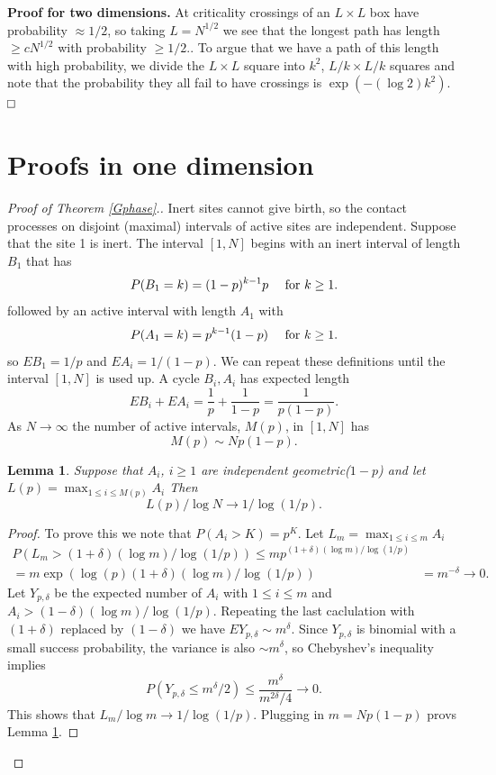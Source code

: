 \documentclass[11pt]{article}
\def\clearp{}
\newtheorem{lemma}{Lemma}[section]
\theoremstyle{definition}
\def\mn{\medskip\noindent}
\def\square{\vcenter{\vbox{\hrule height .4pt
  \hbox{\vrule width .4pt height 5pt \kern 5pt
        \vrule width .4pt} \hrule height .4pt}}}
\def\eopt{\hfill$\square$}
\begin{document}
\mn
{\bf Proof for two dimensions.} At criticality crossings of an $L \times L$ box have probability $\approx 1/2$, so taking $L=N^{1/2}$ we see that the longest path has length $\ge c N^{1/2}$ with probability $\ge 1/2$.. To argue that we have a path of this length with high probability, we divide the $L \times L$ square into $k^2$, $L/k \times L/k$ squares and note that the probability they all fail to have crossings is $\exp(-(\log 2) k^2)$. \eopt


\clearp

\section{Proofs in one dimension} \label{sec:Pf1D}



\begin{proof} [Proof of Theorem \ref{Gphase}.]
Inert sites cannot give birth, so the contact processes on disjoint (maximal) intervals of active sites are independent. Suppose that the site 1 is inert. The interval $[1,N]$ begins with an inert interval of length $B_1$ that has
$$
P(B_1=k) = (1-p)^{k-1} p \quad\hbox{ for $k \ge 1$.}
$$
followed by an active interval with length $A_1$ with
$$
P(A_1=k) =p^{k-1}(1-p)  \quad\hbox{ for $k \ge 1$.}
$$
so $EB_1=1/p$ and $EA_i=1/(1-p)$. We can repeat these definitions until the interval $[1,N]$ is used up. A cycle $B_i,A_i$ has expected length 
$$
EB_i + EA_i = \frac{1}{p} + \frac{1}{1-p} = \frac{1}{p(1-p)}.
$$
As $N\to\infty$ the number of active intervals, $M(p)$,  in $[1,N]$ has
$$
M(p) \sim Np(1-p).
$$

\begin{lemma} \label{maxL1D}
Suppose that $A_i$, $i \ge 1$ are independent geometric($1-p$) and let
$L(p) = \max_{1\le i \le M(p)} A_i$ Then 
$$
L(p)/\log N \to 1/\log(1/p).
$$
\end{lemma}

\begin{proof}
To prove this we note that $P(A_i > K ) = p^K$. Let $L_m = \max_{1\le i \le m} A_i$
\begin{align*}
P( L_m > (1+\delta)(\log m) /\log(1/p) ) 
\le m p^{ (1+\delta)(\log m) /\log(1/p) } &\\
 = m \exp( \log(p) (1+\delta)(\log m) /\log(1/p) ) & = m^{-\delta} \to 0.
\end{align*}
Let $Y_{p,\delta}$ be the expected number of $A_i$ with $1\le i \le m$ and
$A_i > (1-\delta)(\log m) /\log(1/p)$. Repeating the last caclulation with $(1+\delta)$ replaced by $(1-\delta)$ we have $EY_{p,\delta} \sim m^\delta$. Since $Y_{p,\delta}$ is binomial with a small success probability, the variance is also $\sim m^\delta$, so Chebyshev's inequality implies
$$
P( Y_{p,\delta}\le m^\delta/2) \le \frac{m^{\delta}}{m^{2\delta}/4} \to 0.
$$ 
This shows that $L_m/\log m \to 1/\log(1/p)$.
Plugging in $m=Np(1-p)$ provs Lemma \ref{maxL1D}.
\end{proof}


\end{proof}
\end{document}
